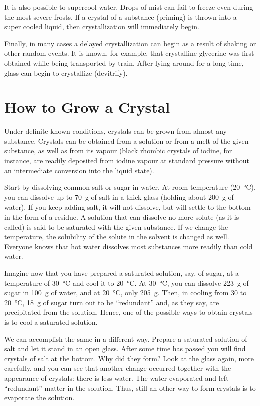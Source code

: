 It is also possible to supercool water. Drops of mist can fail to freeze even during the most severe frosts. If a crystal of a substance (priming) is thrown into a super­ cooled liquid, then crystallization will immediately begin.

Finally, in many cases a delayed crystallization can begin as a result of shaking or other random events. It is known, for example, that crystalline glycerine was first obtained while being transported by train. After lying around for a long time, glass can begin to crystallize (devitrify).

\section{How to Grow a Crystal}

Under definite known conditions, crystals can be grown from almost any substance. Crystals can be obtained from a solution or from a melt of the given substance, as well as from its vapour (black rhombic crystals of iodine, for instance, are readily deposited from iodine vapour at standard pressure without an intermediate conversion into the liquid state).

Start by dissolving common salt or sugar in water. At room temperature (\SI{20}{\celsius}), you can dissolve up to \SI{70}{\gram} of salt in a thick glass (holding about \SI{200}{\gram} of water). If you keep adding salt, it will not dissolve, but will settle to the bottom in the form of a residue. A solution that can dissolve no more solute (as it is called) is said to be saturated with the given substance. If we change the temperature, the solubility of the solute in the solvent is changed as well. Everyone knows that hot water dissolves most substances more readily than cold water.

Imagine now that you have prepared a saturated solu­tion, say, of sugar, at a temperature of \SI{30}{\celsius} and cool it to \SI{20}{\celsius}. At \SI{30}{\celsius}, you can dissolve \SI{223}{\gram} of sugar in \SI{100}{\gram} of water, and at \SI{20}{\celsius}, only \SI{205}{\gram}. Then, in cooling from 30 to \SI{20}{\celsius}, \SI{18}{\gram} of sugar turn out to be ``redundant'' and, as they say, are precipitated from the solution. Hence, one of the possible ways to obtain crystals is to cool a saturated solution.

We can accomplish the same in a different way. Pre­pare a saturated solution of salt and let it stand in an open glass. After some time has passed you will find crystals of salt at the bottom. Why did they form? Look at the glass again, more carefully, and you can see that another change occurred together with the appearance of crystals: there is less water. The water evaporated and left ``redundant'' matter in the solution. Thus, still an­ other way to form crystals is to evaporate the solution.

